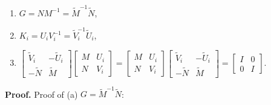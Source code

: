 \documentclass[journal]{IEEEtran}
\begin{document}
\begin{enumerate}
  \item $G=N M^{-1}=\tilde{M}^{-1} \tilde{N}$,
  \item $K_{i}=U_{i} V_{i}^{-1}=\tilde{V}_{i}^{-1} \tilde{U}_{i}$,
  \item    $ \left[\begin{array}{cc}
              \tilde{V}_{i} & -\tilde{U}_{i} \\
              -\tilde{N}    & \tilde{M}
            \end{array}\right]\left[\begin{array}{cc}
              M & U_{i} \\
              N & V_{i}
            \end{array}\right]=\left[\begin{array}{cc}
              M & U_{i} \\
              N & V_{i}
            \end{array}\right]\left[\begin{array}{cc}
              \tilde{V}_{i} & -\tilde{U}_{i} \\
              -\tilde{N}    & \tilde{M}
            \end{array}\right]=\left[\begin{array}{cc}
              I & 0 \\
              0 & I
            \end{array}\right].$
\end{enumerate}


\textbf{Proof.} Proof of (a) $G=\tilde{M}^{-1} \tilde{N}$:
\end{document}
